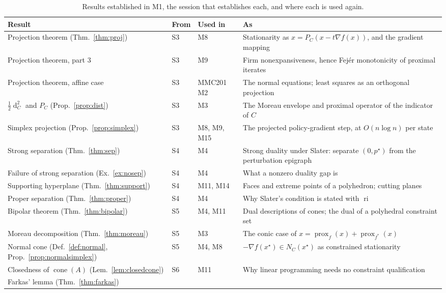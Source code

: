 \documentclass[11pt,a4paper]{article}
\theoremstyle{definition}
\theoremstyle{plain}
\theoremstyle{remark}
\newcommand{\proj}{P}
\DeclareMathOperator{\cone}{cone}
\DeclareMathOperator{\ri}{ri}
\DeclareMathOperator{\dist}{d}
\DeclareMathOperator{\prox}{prox}
\newcommand{\Nc}{N}
\begin{document}
\begin{table}[htbp]
\centering
\small
\caption{Results established in M1, the session that establishes each, and where each is used
again.}
\label{tab:forward}
\begin{tabular}{@{}L{4.7cm} l L{1.8cm} L{6.0cm}@{}}
\toprule
\textbf{Result} & \textbf{From} & \textbf{Used in} & \textbf{As} \\
\midrule
Projection theorem (Thm.~\ref{thm:proj})
  & S3 & M8
  & Stationarity as $x=\proj_C(x-t\nabla f(x))$, and the gradient mapping \\
Projection theorem, part 3
  & S3 & M9
  & Firm nonexpansiveness, hence Fej\'er monotonicity of proximal iterates \\
Projection theorem, affine case
  & S3 & MMC201 M2
  & The normal equations; least squares as an orthogonal projection \\
$\tfrac12\dist_C^2$ and $\proj_C$ (Prop.~\ref{prop:dist})
  & S3 & M3
  & The Moreau envelope and proximal operator of the indicator of $C$ \\
Simplex projection (Prop.~\ref{prop:simplex})
  & S3 & M8, M9, M15
  & The projected policy-gradient step, at $O(n\log n)$ per state \\
Strong separation (Thm.~\ref{thm:sep})
  & S4 & M4
  & Strong duality under Slater: separate $(0,p^\star)$ from the perturbation epigraph \\
Failure of strong separation (Ex.~\ref{ex:nosep})
  & S4 & M4
  & What a nonzero duality gap is \\
Supporting hyperplane (Thm.~\ref{thm:support})
  & S4 & M11, M14
  & Faces and extreme points of a polyhedron; cutting planes \\
Proper separation (Thm.~\ref{thm:proper})
  & S4 & M4
  & Why Slater's condition is stated with $\ri$ \\
Bipolar theorem (Thm.~\ref{thm:bipolar})
  & S5 & M4, M11
  & Dual descriptions of cones; the dual of a polyhedral constraint set \\
Moreau decomposition (Thm.~\ref{thm:moreau})
  & S5 & M3
  & The conic case of $x=\prox_f(x)+\prox_{f^*}(x)$ \\
Normal cone (Def.~\ref{def:normal}, Prop.~\ref{prop:normalsimplex})
  & S5 & M4, M8
  & $-\nabla f(x^\star)\in\Nc_C(x^\star)$ as constrained stationarity \\
Closedness of $\cone(A)$ (Lem.~\ref{lem:closedcone})
  & S6 & M11
  & Why linear programming needs no constraint qualification \\
Farkas' lemma (Thm.~\ref{thm:farkas})

\end{tabular}
\end{table}
\end{document}
